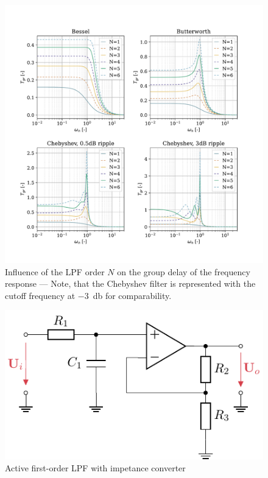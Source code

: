 \begin{figure}[!htb]
  \centering
  \includegraphics[scale=0.72]{figures/electronics/lowpass/lp_filter_grd}
  \caption[Influence of the \ac{LPF} order $N$ on the group delay of the frequency response]{Influence of the \ac{LPF} order $N$ on the group delay of the frequency response --- Note, that the Chebyshev filter is represented with the cutoff frequency at \SI{-3}{\decibel} for comparability.%
  \label{fig:lp_filter_grd}}
\end{figure}

\begin{figure}[!htb]
  \centering
  \includegraphics[scale=1]{figures/electronics/lowpass/lp_active_1ord_imp_conv/lp_active_1ord_imp_conv}
  \caption[Active first-order \ac{LPF} with impetance converter]{Active first-order \ac{LPF} with impetance converter%
    \label{fig:lp_active_1ord_imp_conv}}
\end{figure}

